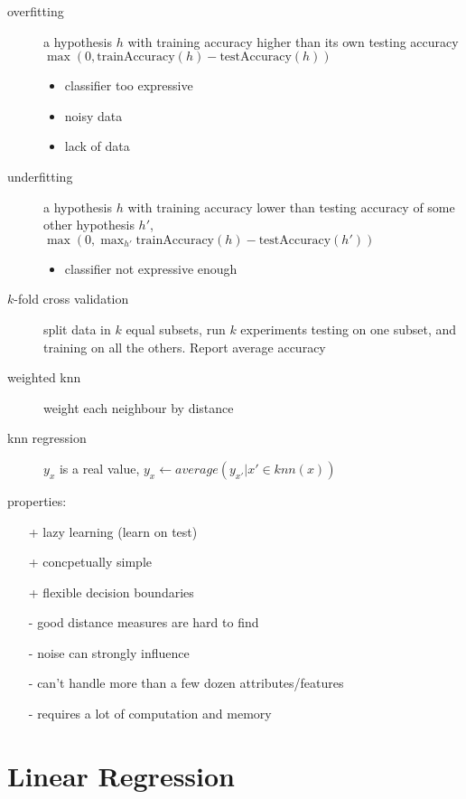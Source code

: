 \documentclass[]{article}
\theoremstyle{definition}
\begin{document}
\begin{description}
    \item[overfitting] a hypothesis $h$ with training accuracy higher than its own testing accuracy $\max (0, \text{trainAccuracy}(h) - \text{testAccuracy}(h))$
        \begin{itemize}
            \item classifier too expressive
            \item noisy data
            \item lack of data
        \end{itemize}
    \item[underfitting] a hypothesis $h$ with training accuracy lower than testing accuracy of some other hypothesis $h'$, 
        $\max (0, \max_{h'} \text{trainAccuracy}(h) - \text{testAccuracy}(h'))$
        \begin{itemize}
            \item classifier not expressive enough
        \end{itemize}
    \item[$k$-fold cross validation] split data in $k$ equal subsets, run $k$ experiments testing on one subset, and training on all the others. Report average accuracy
\end{description}

\begin{description}
    \item[weighted knn] weight each neighbour by distance
    \item[knn regression] $y_x$ is a real value, $ y_x \leftarrow average({y_{x'}|x' \in knn(x)})$
\end{description}

properties:
\begin{itemize}
    \item[+] lazy learning (learn on test)
    \item[+] concpetually simple
    \item[+] flexible decision boundaries
    \item[-] good distance measures are hard to find
    \item[-] noise can strongly influence
    \item[-] can't handle more than a few dozen attributes/features
    \item[-] requires a lot of computation and memory
\end{itemize}

\section{Linear Regression}
\label{sec:linear_regression}
\end{document}
